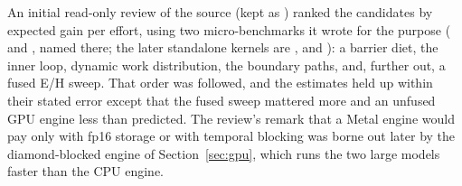 \begin{table}[H]\centering\small
{}
\caption{Stock v0.37.0, \MC. Every engine's port probes and $S$-parameters were bit-identical to the basic engine's
(patch x5: $S_{11}$ only; notch x3: port~1 only, since the pulse has not reached port~2 by the end of the run).}
\label{tab:step1}
\end{table}

An initial read-only review of the source (kept as ) ranked the
candidates by expected gain per effort, using two micro-benchmarks it wrote for the purpose (
and , named there; the later standalone kernels are ,
 and ): a barrier diet, the inner loop, dynamic work distribution, the boundary paths, and, further out, a
fused E/H sweep. That order was followed, and the estimates held up within their stated error except that the fused
sweep mattered more and an unfused GPU engine less than predicted. The review's remark that a Metal engine would pay
only with fp16 storage or with temporal blocking was borne out later by the diamond-blocked engine of
Section~\ref{sec:gpu}, which runs the two large models faster than the CPU engine.
